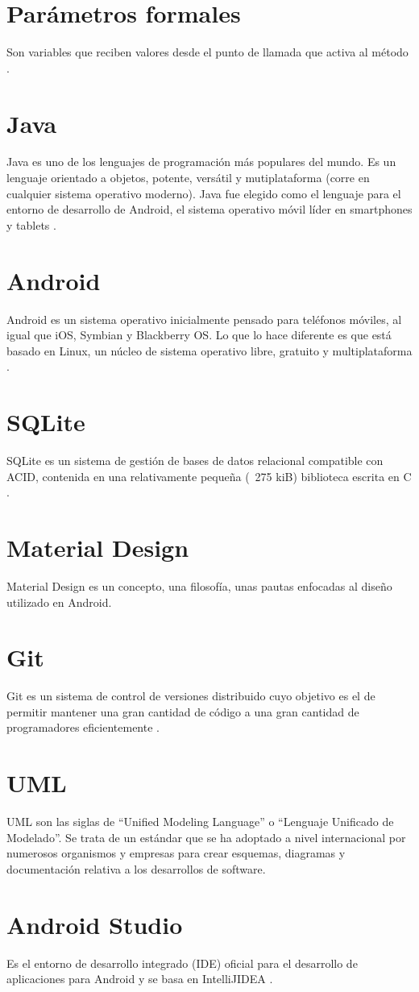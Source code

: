 \section{Parámetros formales}
Son variables que reciben valores desde el punto de llamada que activa al método \citep{izquierdo2007introduccion}.

\section{Java}
Java es uno de los lenguajes de programación más populares del mundo. Es un lenguaje orientado a objetos, potente, versátil y mutiplataforma (corre en cualquier sistema operativo moderno). Java fue elegido como el lenguaje para el entorno de desarrollo de Android, el sistema operativo móvil líder en smartphones y tablets \citep{izquierdo2007introduccion}.

\section{Android}
Android es un sistema operativo inicialmente pensado para teléfonos móviles, al igual que iOS, Symbian y Blackberry OS. Lo que lo hace diferente es que está basado en Linux, un núcleo de sistema operativo libre, gratuito y multiplataforma \citep{studio2016conoce}.

\section{SQLite}
SQLite es un sistema de gestión de bases de datos relacional compatible con ACID, contenida en una relativamente pequeña (~275 kiB) biblioteca escrita en C \citep{owens2010sqlite}.

\section{Material Design}
Material Design es un concepto, una filosofía, unas pautas enfocadas al diseño utilizado en Android.

\section{Git}
Git es un sistema de control de versiones distribuido cuyo objetivo es el de permitir mantener una gran cantidad de código a una gran cantidad de programadores eficientemente \citep{alvarez2014introduccion}.

\section{UML}
UML son las siglas de “Unified Modeling Language” o “Lenguaje Unificado de Modelado”. Se trata de un estándar que se ha adoptado a nivel internacional por numerosos organismos y empresas para crear esquemas, diagramas y documentación relativa a los desarrollos de software.

\section{Android Studio}
Es el entorno de desarrollo integrado (IDE) oficial para el desarrollo de aplicaciones para Android y se basa en IntelliJIDEA \citep{studio2016conoce}.